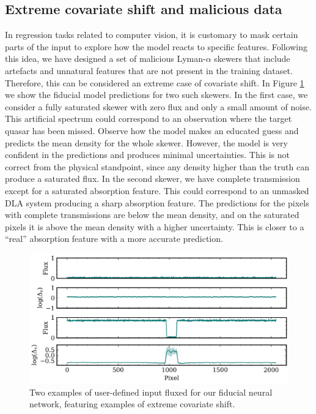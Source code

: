 \subsection{Extreme covariate shift and malicious data}
In regression tasks related to computer vision, it is customary to mask certain parts of the input to explore how the model reacts to specific features. Following this idea, we have designed a set of malicious Lyman-$\alpha$ skewers that include artefacts and unnatural features that are not present in the training dataset. Therefore, this can be considered an extreme case of covariate shift. In Figure \ref{fig: skewer malicious} we show the fiducial model predictions for two such skewers. In the first case, we consider a fully saturated skewer with zero flux and only a small amount of noise. This artificial spectrum could correspond to an observation where the target quasar has been missed. Observe how the model makes an educated guess and predicts the mean density for the whole skewer. However, the model is very confident in the predictions and produces minimal uncertainties. This is not correct from the physical standpoint, since any density higher than the truth can produce a saturated flux. In the second skewer, we have complete transmission except for a saturated absorption feature. This could correspond to an unmasked DLA system producing a sharp absorption feature. The predictions for the pixels with complete transmissions are below the mean density, and on the saturated pixels it is above the mean density with a higher uncertainty. This is closer to a ``real'' absorption feature with a more accurate prediction.

\begin{figure}
    \centering
    \includegraphics[width=0.9\linewidth]{img/ML/malicious_input.png}
    \caption{Two examples of user-defined input fluxed for our fiducial neural network, featuring examples of extreme covariate shift.}
    \label{fig: skewer malicious}
\end{figure}


